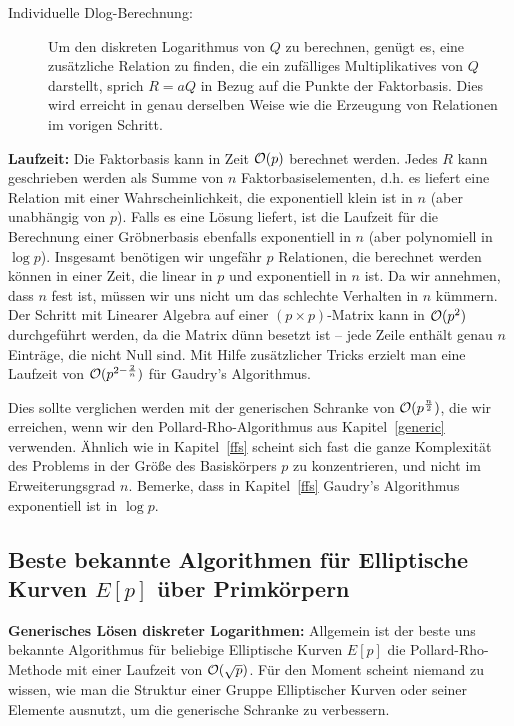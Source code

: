 \begin{refsegment}
\begin{description}
\item[Individuelle Dlog-Berechnung:] Um den diskreten Logarithmus von $Q$ zu berechnen, genügt es, eine zusätzliche Relation zu finden, die ein zufälliges Multiplikatives von $Q$ darstellt, sprich $R=aQ$ in Bezug auf die Punkte der Faktorbasis. Dies wird erreicht in genau derselben Weise wie die Erzeugung von Relationen im vorigen Schritt.
\end{description}


\noindent \textbf{Laufzeit:}
Die Faktorbasis kann in Zeit ${\cal O}(p)$ berechnet werden. Jedes $R$ kann geschrieben werden als Summe von $n$ Faktorbasiselementen, d.h. es liefert eine Relation mit einer Wahrscheinlichkeit, die exponentiell klein ist in $n$ (aber unabhängig von $p$). Falls es eine Lösung liefert, ist die Laufzeit für die Berechnung einer Gröbnerbasis ebenfalls exponentiell in $n$ (aber polynomiell in $\log p$). Insgesamt benötigen wir ungefähr $p$ Relationen, die berechnet werden können in einer Zeit, die linear in $p$ und exponentiell in $n$ ist. Da wir annehmen, dass $n$ fest ist, müssen wir uns nicht um das schlechte Verhalten in $n$ kümmern. Der Schritt mit Linearer Algebra auf einer $(p \times p)$-Matrix kann in ${\cal O}(p^2)$ durchgeführt werden, da die Matrix dünn besetzt ist -- jede Zeile enthält genau $n$ Einträge, die nicht Null sind. Mit Hilfe zusätzlicher Tricks erzielt man eine Laufzeit von ${\cal O}(p^{2-\frac 2 n})$ für Gaudry's Algorithmus.

Dies sollte verglichen werden mit der generischen Schranke von ${\cal O}(p^{\frac n 2})$, die wir erreichen, wenn wir den Pollard-Rho-Algorithmus aus Kapitel~\ref{generic} verwenden. Ähnlich wie in Kapitel~\ref{ffs} scheint sich fast die ganze Komplexität des Problems in der Größe des Basiskörpers $p$ zu konzentrieren, und nicht im Erweiterungsgrad $n$. Bemerke, dass in Kapitel~\ref{ffs} Gaudry's Algorithmus exponentiell ist in $\log p$.



\subsection{\texorpdfstring{Beste bekannte Algorithmen für Elliptische Kurven $E[p]$ über Primkörpern}{Beste bekannte Algorithmen für Elliptische Kurven E[p] über Primkörpern}}

\noindent \textbf{Generisches Lösen diskreter Logarithmen:}
Allgemein ist der beste uns bekannte Algorithmus für beliebige Elliptische Kurven $E[p]$ die Pollard-Rho-Methode mit einer Laufzeit von ${\cal O}(\sqrt p)$. Für den Moment scheint niemand zu wissen, wie man die Struktur einer Gruppe Elliptischer Kurven oder seiner Elemente ausnutzt, um die generische Schranke zu verbessern.


\end{refsegment}
